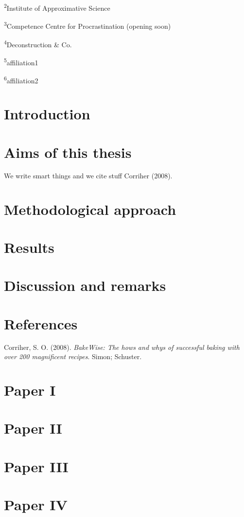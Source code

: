 \documentclass[
  letterpaper,
  DIV=11,
  numbers=noendperiod]{scrartcl}
\newlength{\cslhangindent}
\newenvironment{CSLReferences}[2] %
 {\begin{list}{}{%
  \setlength{\itemindent}{0pt}
  \setlength{\leftmargin}{0pt}
  \setlength{\parsep}{0pt}
  \ifodd #1
   \setlength{\leftmargin}{\cslhangindent}
   \setlength{\itemindent}{-1\cslhangindent}
  \fi
  \setlength{\itemsep}{#2\baselineskip}}}
 {\end{list}}
\begin{document}
\textsuperscript{2}Institute of Approximative Science

\textsuperscript{3}Competence Centre for Procrastination (opening soon)

\textsuperscript{4}Deconstruction \& Co.

\textsuperscript{5}affiliation1

\textsuperscript{6}affiliation2

\tableofcontents

\section{Introduction}\label{introduction}

\section{Aims of this thesis}\label{aims-of-this-thesis}

We write smart things and we cite stuff Corriher (2008).

\section{Methodological approach}\label{methodological-approach}

\section{Results}\label{results}

\section{Discussion and remarks}\label{discussion-and-remarks}

\section{References}\label{references}

\label{refs-references}
\begin{CSLReferences}{1}{0}
Corriher, S. O. (2008). \emph{BakeWise: The hows and whys of successful
baking with over 200 magnificent recipes}. Simon; Schuster.

\end{CSLReferences}

\section{Paper I}\label{paper-i}

\section{Paper II}\label{paper-ii}

\section{Paper III}\label{paper-iii}

\section{Paper IV}\label{paper-iv}
\end{document}
